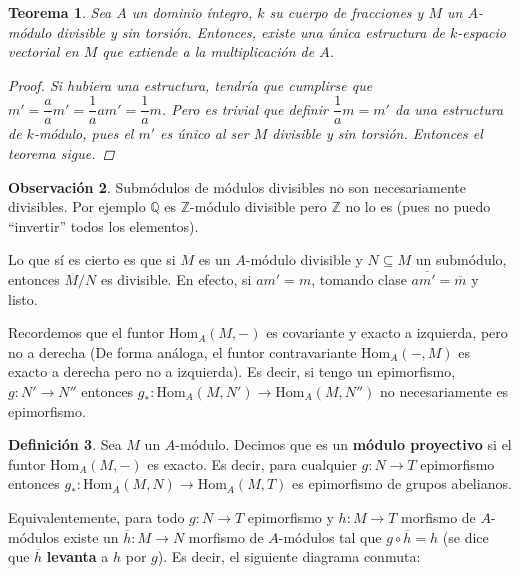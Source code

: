 \documentclass[12pt]{book}
\newtheorem{teo}{Teorema}[section]
\theoremstyle{definition}
\newtheorem{obs}[teo]{Observación}
\newtheorem{defn}[teo]{Definición}
\newcommand{\ZZ}{\mathbb{Z}}      %
\newcommand{\QQ}{\mathbb{Q}}
\renewcommand{\hom}{\mathrm{Hom}}
\begin{document}
\begin{teo}
Sea $A$ un dominio íntegro, $k$ su cuerpo de fracciones y $M$ un $A$-módulo divisible y sin torsión. Entonces, existe una única estructura de $k$-espacio vectorial en $M$ que extiende a la multiplicación de $A$.
\begin{proof}
Si hubiera una estructura, tendría que cumplirse que $m' = \dfrac{a}{a}m' = \dfrac{1}{a} am' = \dfrac{1}{a}m$. Pero es trivial que definir $\dfrac{1}{a}m = m'$ da una estructura de $k$-módulo, pues el $m'$ es único al ser $M$ divisible y sin torsión. Entonces el teorema sigue.
\end{proof}
\end{teo}

\begin{obs}
Submódulos de módulos divisibles no son necesariamente divisibles. Por ejemplo $\QQ$ es $\ZZ$-módulo divisible pero $\ZZ$ no lo es (pues no puedo "`invertir"' todos los elementos).

Lo que sí es cierto es que si $M$ es un $A$-módulo divisible y $N\subseteq M$ un submódulo, entonces $M/N$ es divisible. En efecto, si $am'=m$, tomando clase $a\overline{m'} = \overline{m}$ y listo.
\end{obs}

Recordemos que el funtor $\hom_A(M,-)$ es covariante y exacto a izquierda, pero no a derecha (De forma análoga, el funtor contravariante $\hom_A(-,M)$ es exacto a derecha pero no a izquierda). Es decir, si tengo un epimorfismo, $g:N'\to N''$ entonces $g_*:\hom_A(M,N')\to\hom_A(M,N'')$ no necesariamente es epimorfismo. 

\begin{defn}
Sea $M$ un $A$-módulo. Decimos que es un \textbf{módulo proyectivo} si el funtor $\hom_A(M,-)$ es exacto. Es decir, para cualquier $g:N\to T$ epimorfismo entonces $g_*:\hom_A(M,N)\to \hom_A(M,T)$ es epimorfismo de grupos abelianos.

Equivalentemente, para todo $g:N\to T$ epimorfismo y $h:M\to T$ morfismo de $A$-módulos existe un $\overline{h}:M\to N$ morfismo de $A$-módulos tal que $g\circ \overline{h} = h$ (se dice que $\overline{h}$ \textbf{levanta} a $h$ por $g$). Es decir, el siguiente diagrama conmuta:

\end{defn}
\end{document}
